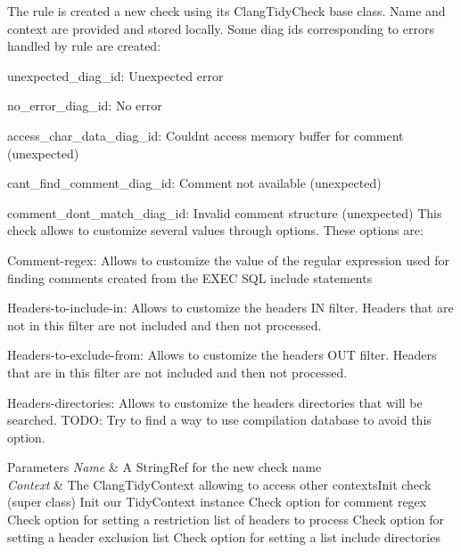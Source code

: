 The rule is created a new check using its {\ttfamily Clang\+Tidy\+Check} base class. Name and context are provided and stored locally. Some diag ids corresponding to errors handled by rule are created\+:
\begin{DoxyItemize}
\item {\ttfamily unexpected\+\_\+diag\+\_\+id\+:} Unexpected error
\item {\ttfamily no\+\_\+error\+\_\+diag\+\_\+id\+:} No error
\item {\ttfamily access\+\_\+char\+\_\+data\+\_\+diag\+\_\+id\+:} Couldn\textquotesingle{}t access memory buffer for comment (unexpected)
\item {\ttfamily cant\+\_\+find\+\_\+comment\+\_\+diag\+\_\+id\+:} Comment not available (unexpected)
\item {\ttfamily comment\+\_\+dont\+\_\+match\+\_\+diag\+\_\+id\+:} Invalid comment structure (unexpected) This check allows to customize several values through options. These options are\+:
\item {\ttfamily Comment-\/regex}\+: Allows to customize the value of the regular expression used for finding comments created from the E\+X\+EC S\+QL include statements
\item {\ttfamily Headers-\/to-\/include-\/in}\+: Allows to customize the headers IN filter. Headers that are not in this filter are not included and then not processed.
\item {\ttfamily Headers-\/to-\/exclude-\/from}\+: Allows to customize the headers O\+UT filter. Headers that are in this filter are not included and then not processed.
\item {\ttfamily Headers-\/directories}\+: Allows to customize the headers directories that will be searched. T\+O\+DO\+: Try to find a way to use compilation database to avoid this option.
\end{DoxyItemize}


\begin{DoxyParams}{Parameters}
{\em Name} & A String\+Ref for the new check name \\
\hline
{\em Context} & The Clang\+Tidy\+Context allowing to access other contexts\+Init check (super class) Init our Tidy\+Context instance Check option for comment regex Check option for setting a restriction list of headers to process Check option for setting a header exclusion list Check option for setting a list include directories \\
\hline
\end{DoxyParams}



